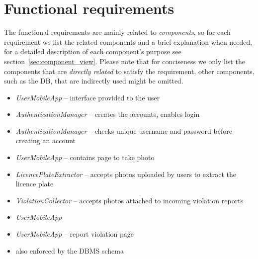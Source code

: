 \section{Functional requirements}
The functional requirements are mainly related to \emph{components}, so for each
requirement we list the related components and a brief explanation when needed,
for a detailed description of each component's purpose see
section~\ref{sec:component_view}. Please note that for conciseness we only list
the components that are \emph{directly related} to satisfy the requirement,
other components, such as the DB, that are indirectly used might be omitted.

\begin{description}
    \begin{itemize}
        \item \emph{UserMobileApp} -- interface provided to the user
        \item \emph{AuthenticationManager} -- creates the accounts, enables
        login
    \end{itemize}

    \begin{itemize}
        \item \emph{AuthenticationManager} -- checks unique username and
        password before creating an account
    \end{itemize}

    \begin{itemize}
        \item \emph{UserMobileApp} -- contains page to take photo
        \item \emph{LicencePlateExtractor} -- accepts photos uploaded by users
        to extract the licence plate
        \item \emph{ViolationCollector} -- accepts photos attached to incoming
        violation reports
    \end{itemize}

    \begin{itemize}
        \item \emph{UserMobileApp}
    \end{itemize}

    \begin{itemize}
        \item \emph{UserMobileApp} -- report violation page
        \item also enforced by the DBMS schema
    \end{itemize}


\end{description}
